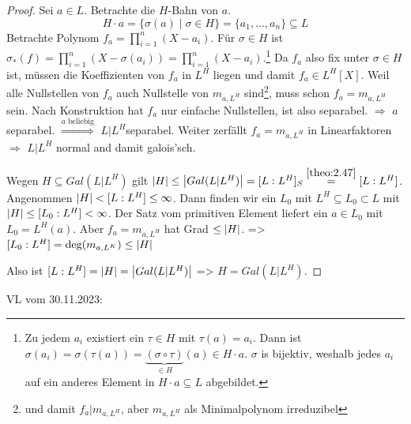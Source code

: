 \documentclass[../main.tex]{subfiles}
\begin{document}
\begin{proof}
    Sei $a\in L$. Betrachte die $H$-Bahn von $a$.
    $$H\cdot a = \{\sigma(a)\mid \sigma\in H\} = \{a_1,\dots, a_n\} \subseteq L$$
    Betrachte Polynom $f_a = \prod_{i=1}^n (X-a_i)$.
    Für $\sigma\in H$ ist $\sigma_*(f) = \prod_{i=1}^n\left(X-\sigma(a_i)\right) = \prod_{i=1}^n(X-a_i)$.\footnote{Zu jedem $a_i$ existiert ein $\tau\in H$ mit $\tau(a) = a_i$. Dann ist $\sigma(a_i) = \sigma(\tau(a)) = \underbrace{(\sigma\circ \tau)}_{\in H}(a)\in H\cdot a$.
    $\sigma$ is bijektiv, weshalb jedes $a_i$ auf ein anderes Element in $H\cdot a\subseteq L$ abgebildet.}
    Da $f_a$ also fix unter $\sigma\in H$ ist, müssen die Koeffizienten von $f_a$ in $L^H$ liegen und damit $f_a\in L^H[X]$.
    Weil alle Nullstellen von $f_a$ auch Nullstelle von $m_{a,L^H}$ sind\footnote{und damit $f_a|m_{a,L^H}$, aber $m_{a,L^H}$ als Minimalpolynom irreduzibel}, muss schon $f_a=m_{a,L^H}$ sein.
    Nach Konstruktion hat $f_a$ nur einfache Nullstellen, ist also separabel. $\Rightarrow$ $a$ separabel. $\overset{a\text{ beliebig}}{\Rightarrow}$ $L|L^H$separabel.
    Weiter zerfällt $f_a=m_{a,L^H}$ in Linearfaktoren $\Rightarrow$ $L|L^H$ normal and damit galois'sch.

    Wegen $H\subseteq Gal(L|L^H)$ gilt $\card{H}\leq \card{Gal(L|L^H)} = [L:L^H]_S \overset{\cref{theo:2.47}}{=} [L:L^H]$.
    Angenommen $\left\vert H \right\vert < [L:L^H]\leq \infty$. 
    Dann finden wir ein $L_0$ mit $L^H\subseteq L_0 \subset L$ mit $\left\vert H \right\vert \leq [L_0:L^H] <\infty$.
    Der Satz vom primitiven Element liefert ein $a\in L_0$ mit $L_0 = L^H(a)$.
    Aber $f_a=m_{a,L^H}$ hat Grad $\leq \left\vert H \right\vert$.
    => $[L_0:L^H] = \deg(m_{a,L^K})\leq \left\vert H \right\vert$ \Lightning

    Also ist $[L:L^H] = \left\vert H \right\vert = \left\vert Gal(L|L^H) \right\vert$
    => $H=Gal(L|L^H)$.
\end{proof}
\begin{flushright}
VL vom 30.11.2023:
\end{flushright}
\end{document}
